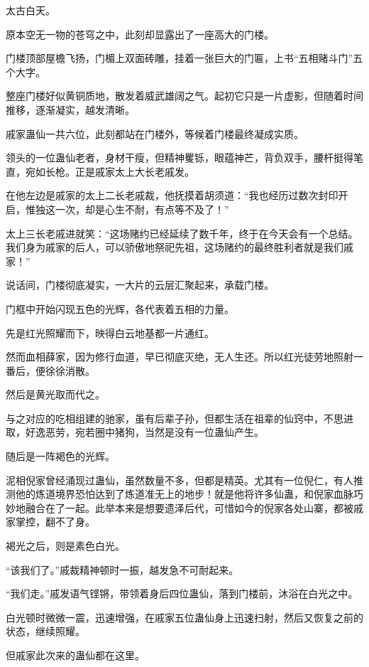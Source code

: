 
\begin{this_body}

太古白天。

原本空无一物的苍穹之中，此刻却显露出了一座高大的门楼。

门楼顶部屋檐飞扬，门楣上双面砖雕，挂着一张巨大的门匾，上书“五相赌斗门”五个大字。

整座门楼好似黄铜质地，散发着威武雄阔之气。起初它只是一片虚影，但随着时间推移，逐渐凝实，越发清晰。

戚家蛊仙一共六位，此刻都站在门楼外，等候着门楼最终凝成实质。

领头的一位蛊仙老者，身材干瘦，但精神矍铄，眼蕴神芒，背负双手，腰杆挺得笔直，宛如长枪。正是戚家太上大长老戚发。

在他左边是戚家的太上二长老戚裁，他抚摸着胡须道：“我也经历过数次封印开启，惟独这一次，却是心生不耐，有点等不及了！”

太上三长老戚进就笑：“这场赌约已经延续了数千年，终于在今天会有一个总结。我们身为戚家的后人，可以骄傲地祭祀先祖，这场赌约的最终胜利者就是我们戚家！”

说话间，门楼彻底凝实，一大片的云层汇聚起来，承载门楼。

门框中开始闪现五色的光辉，各代表着五相的力量。

先是红光照耀而下，映得白云地基都一片通红。

然而血相薛家，因为修行血道，早已彻底灭绝，无人生还。所以红光徒劳地照射一番后，便徐徐消散。

然后是黄光取而代之。

与之对应的吃相组建的驰家，虽有后辈子孙，但都生活在祖辈的仙窍中，不思进取，好逸恶劳，宛若圈中猪狗，当然是没有一位蛊仙产生。

随后是一阵褐色的光辉。

泥相倪家曾经涌现过蛊仙，虽然数量不多，但都是精英。尤其有一位倪仁，有人推测他的炼道境界恐怕达到了炼道准无上的地步！就是他将许多仙蛊，和倪家血脉巧妙地融合在了一起。此举本来是想要遗泽后代，可惜如今的倪家各处山寨，都被戚家掌控，翻不了身。

褐光之后，则是素色白光。

“该我们了。”戚裁精神顿时一振，越发急不可耐起来。

“我们走。”戚发语气铿锵，带领着身后四位蛊仙，落到门楼前，沐浴在白光之中。

白光顿时微微一震，迅速增强，在戚家五位蛊仙身上迅速扫射，然后又恢复之前的状态，继续照耀。

但戚家此次来的蛊仙都在这里。


\end{this_body}
